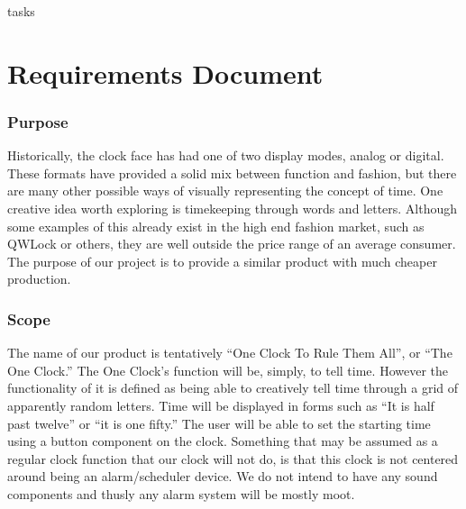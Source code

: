 tasks\documentclass[onecolumn, draftclsnofoot,10pt, compsoc]{IEEEtran}
\begin{document}
\section{Requirements Document}
\subsubsection{Purpose}
Historically, the clock face has had one of two display modes, analog or digital.
These formats have provided a solid mix between function and fashion, but there are many
other possible ways of visually representing the concept of time. One creative idea worth
exploring is timekeeping through words and letters. Although some examples of this already
exist in the high end fashion market, such as QWLock or others, they are well outside the
price range of an average consumer. The purpose of our project is to provide a similar
product with much cheaper production.

\subsubsection{Scope}
The name of our product is tentatively “One Clock To Rule Them All”, or “The One Clock.”
The One Clock’s function will be, simply, to tell time. However the functionality of it is
defined as being able to creatively tell time through a grid of apparently random letters.
Time will be displayed in forms such as “It is half past twelve” or “it is one fifty.” The
user will be able to set the starting time using a button component on the clock. Something
that may be assumed as a regular clock function that our clock will not do, is that this clock
 is not centered around being an alarm/scheduler device. We do not intend to have any sound
 components and thusly any alarm system will be mostly moot.
\end{document}
